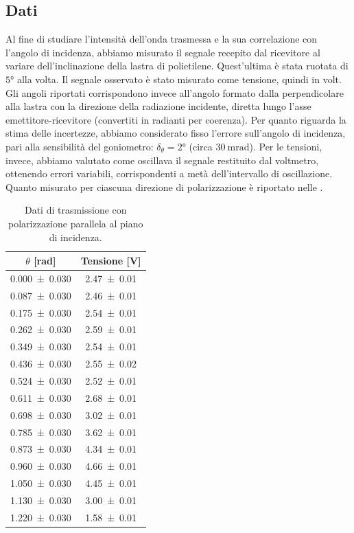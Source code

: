 \documentclass[a4paper]{article}
\begin{document}
\subsection{Dati}
Al fine di studiare l'intensità dell'onda trasmessa e la sua correlazione con l'angolo di incidenza, abbiamo misurato il segnale recepito dal ricevitore al variare dell'inclinazione della lastra di polietilene. Quest'ultima è stata ruotata di $\ang{5}$ alla volta. Il segnale osservato è stato misurato come tensione, quindi in volt. Gli angoli riportati corrispondono invece all'angolo formato dalla perpendicolare alla lastra con la direzione della radiazione incidente, diretta lungo l'asse emettitore-ricevitore (convertiti in radianti per coerenza). Per quanto riguarda la stima delle incertezze, abbiamo considerato fisso l'errore sull'angolo di incidenza, pari alla sensibilità del goniometro: $\delta_{\theta}=\ang{2}$ (circa $\SI{30}{\milli\radian}$). Per le tensioni, invece, abbiamo valutato come oscillava il segnale restituito dal voltmetro, ottenendo errori variabili, corrispondenti a metà dell'intervallo di oscillazione. Quanto misurato per ciascuna direzione di polarizzazione è riportato nelle .

\begin{table}[htbp]
\centering
\caption{Dati di trasmissione con polarizzazione parallela al piano di incidenza.}
\label{tab:brewster_par}
\begin{tabular}{|c|c|}
\hline
$\theta$ [\si{\radian}] & Tensione [\si{\volt}] \\\hline\hline
\num{0.000 \pm 0.030} & \num{2.47 \pm 0.01} \\
\num{0.087 \pm 0.030} & \num{2.46 \pm 0.01} \\
\num{0.175 \pm 0.030} & \num{2.54 \pm 0.01} \\
\num{0.262 \pm 0.030} & \num{2.59 \pm 0.01} \\
\num{0.349 \pm 0.030} & \num{2.54 \pm 0.01} \\
\num{0.436 \pm 0.030} & \num{2.55 \pm 0.02} \\
\num{0.524 \pm 0.030} & \num{2.52 \pm 0.01} \\
\num{0.611 \pm 0.030} & \num{2.68 \pm 0.01} \\
\num{0.698 \pm 0.030} & \num{3.02 \pm 0.01} \\
\num{0.785 \pm 0.030} & \num{3.62 \pm 0.01} \\
\num{0.873 \pm 0.030} & \num{4.34 \pm 0.01} \\
\num{0.960 \pm 0.030} & \num{4.66 \pm 0.01} \\
\num{1.050 \pm 0.030} & \num{4.45 \pm 0.01} \\
\num{1.130 \pm 0.030} & \num{3.00 \pm 0.01} \\
\num{1.220 \pm 0.030} & \num{1.58 \pm 0.01} \\
\hline
\end{tabular}
\end{table}
\end{document}
